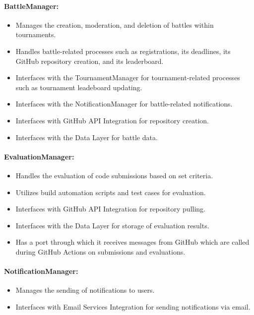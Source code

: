 \documentclass{article}
\begin{document}
\paragraph{BattleManager:}

\begin{itemize}
    \item Manages the creation, moderation, and deletion of battles within tournaments.
    \item Handles battle-related processes such as registrations, its deadlines, its GitHub 
    repository creation, and its leaderboard.
    \item Interfaces with the TournamentManager for tournament-related processes such as tournament leadeboard updating.
    \item Interfaces with the NotificationManager for battle-related notifications.
    \item Interfaces with GitHub API Integration for repository creation.
    \item Interfaces with the Data Layer for battle data.
\end{itemize}

\paragraph{EvaluationManager:}

\begin{itemize}
    \item Handles the evaluation of code submissions based on set criteria.
    \item Utilizes build automation scripts and test cases for evaluation.
    \item Interfaces with GitHub API Integration for repository pulling.
    \item Interfaces with the Data Layer for storage of evaluation results.
    \item Has a port through which it receives messages from GitHub which are called during GitHub Actions on submissions and evaluations.
\end{itemize}

\paragraph{NotificationManager:}

\begin{itemize}
    \item Manages the sending of notifications to users.
    \item Interfaces with Email Services Integration for sending notifications via email.
\end{itemize}
\end{document}

